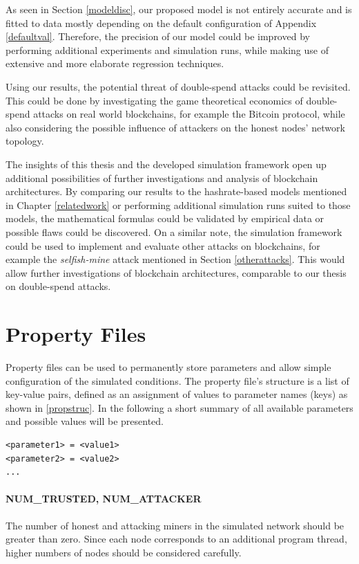 \documentclass[a4paper,12pt,twoside]{report}
\begin{document}
As seen in Section \ref{modeldisc}, our proposed model is not entirely accurate and is fitted to data mostly depending on the default configuration of Appendix \ref{defaultval}. Therefore, the precision of our model could be improved by performing additional experiments and simulation runs, while making use of extensive and more elaborate regression techniques.

Using our results, the potential threat of double-spend attacks could be revisited. This could be done by investigating the game theoretical economics of double-spend attacks on real world blockchains, for example the Bitcoin protocol, while also considering the possible influence of attackers on the honest nodes' network topology.

The insights of this thesis and the developed simulation framework open up additional possibilities of further investigations and analysis of blockchain architectures. By comparing our results to the hashrate-based models mentioned in Chapter \ref{relatedwork} or performing additional simulation runs suited to those models, the mathematical formulas could be validated by empirical data or possible flaws could be discovered. On a similar note, the simulation framework could be used to implement and evaluate other attacks on blockchains, for example the \textit{selfish-mine} attack mentioned in Section \ref{otherattacks}. This would allow further investigations of blockchain architectures, comparable to our thesis on double-spend attacks. 



\appendix

\chapter{Property Files} \label{prop}
Property files can be used to permanently store parameters and allow simple configuration of the simulated conditions. The property file's structure is a list of key-value pairs, defined as an assignment of values to parameter names (keys) as shown in \autoref{propstruc}. In the following a short summary of all available parameters and possible values will be presented.
\begin{lstlisting}[caption=Property file structure,label=propstruc]
<parameter1> = <value1>
<parameter2> = <value2>
...
\end{lstlisting}
\subsubsection{NUM\_TRUSTED, NUM\_ATTACKER}
The number of honest and attacking miners in the simulated network should be greater than zero. Since each node corresponds to an additional program thread, higher numbers of nodes should be considered carefully.
\end{document}
